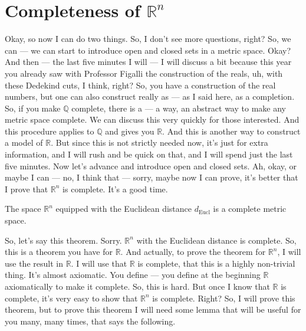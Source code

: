 \section{Completeness of \texorpdfstring{$\mathbb{R}^n$}{Rn}}

\begin{spoken-clean}[00:09:25 - 00:11:08]
Okay, so now I can do two things. So, I don't see more questions, right? So, we can --- we can start to introduce open and closed sets in a metric space. Okay? And then --- the last five minutes I will --- I will discuss a bit because this year you already saw with Professor Figalli the construction of the reals, uh, with these Dedekind cuts, I think, right? So, you have a construction of the real numbers, but one can also construct really as --- as I said here, as a completion. So, if you make $\mathbb{Q}$ complete, there is a --- a way, an abstract way to make any metric space complete. We can discuss this very quickly for those interested. And this procedure applies to $\mathbb{Q}$ and gives you $\mathbb{R}$. And this is another way to construct a model of $\mathbb{R}$. But since this is not strictly needed now, it's just for extra information, and I will rush and be quick on that, and I will spend just the last five minutes. Now let's advance and introduce open and closed sets. Ah, okay, or maybe I can --- no, I think that --- sorry, maybe now I can prove, it's better that I prove that $\mathbb{R}^n$ is complete. It's a good time.
\end{spoken-clean}

\begin{nice-box}
\begin{theorem}\label{thm:rn-complete}
The space $\mathbb{R}^n$ equipped with the Euclidean distance $d_{\text{Eucl}}$ is a complete metric space.
\end{theorem}
\end{nice-box}

\begin{spoken-clean}[00:11:08 - 00:12:38]
So, let's say this theorem.  Sorry. $\mathbb{R}^n$ with the Euclidean distance is complete. So, this is a theorem you have for $\mathbb{R}$. And actually, to prove the theorem for $\mathbb{R}^n$, I will use the result in $\mathbb{R}$. I will use that $\mathbb{R}$ is complete, that this is a highly non-trivial thing. It's almost axiomatic. You define --- you define at the beginning $\mathbb{R}$ axiomatically to make it complete. So, this is hard. But once I know that $\mathbb{R}$ is complete, it's very easy to show that $\mathbb{R}^n$ is complete. Right? So, I will prove this theorem, but to prove this theorem I will need some lemma that will be useful for you many, many times, that says the following.
\end{spoken-clean}

